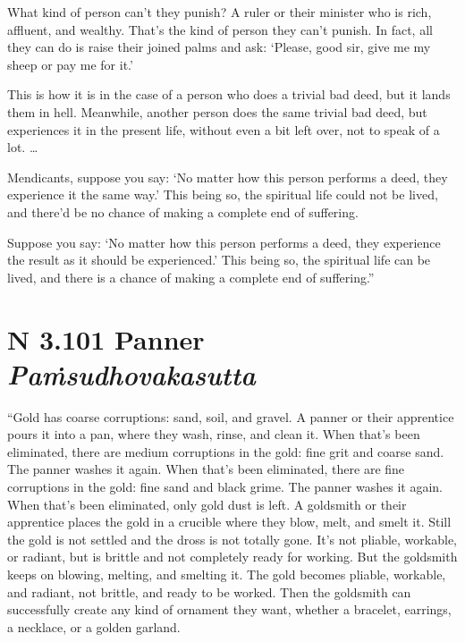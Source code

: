 \documentclass[12pt,openany]{book}%
\newcommand*{\suttatitleacronym}[1]{\smaller[2]{#1}\vspace*{.3em}}
\newcommand*{\suttatitletranslation}[1]{\linebreak{#1}}
\newcommand*{\suttatitleroot}[1]{\linebreak\smaller[2]\itshape{#1}}
\newcommand*{\tocacronym}[1]{\hspace*{-3.3em}{#1}\quad}
\newcommand*{\toctranslation}[1]{#1}
\newcommand*{\tocroot}[1]{(\textit{#1})}
\begin{document}
What kind of person can’t they punish? A ruler or their minister who is rich, affluent, and wealthy. That’s the kind of person they can’t punish. In fact, all they can do is raise their joined palms and ask: ‘Please, good sir, give me my sheep or pay me for it.’ 

This is how it is in the case of a person who does a trivial bad deed, but it lands them in hell. Meanwhile, another person does the same trivial bad deed, but experiences it in the present life, without even a bit left over, not to speak of a lot. … 

Mendicants, suppose you say: ‘No matter how this person performs a deed, they experience it the same way.’ This being so, the spiritual life could not be lived, and there’d be no chance of making a complete end of suffering. 

Suppose you say: ‘No matter how this person performs a deed, they experience the result as it should be experienced.’ This being so, the spiritual life can be lived, and there is a chance of making a complete end of suffering.” 

%
\section*{{\suttatitleacronym AN 3.101}{\suttatitletranslation A Panner }{\suttatitleroot Paṁsudhovakasutta}}
\addcontentsline{toc}{section}{\tocacronym{AN 3.101} \toctranslation{A Panner } \tocroot{Paṁsudhovakasutta}}

“Gold has coarse corruptions: sand, soil, and gravel. A panner or their apprentice pours it into a pan, where they wash, rinse, and clean it. When that’s been eliminated, there are medium corruptions in the gold: fine grit and coarse sand. The panner washes it again. When that’s been eliminated, there are fine corruptions in the gold: fine sand and black grime. The panner washes it again. When that’s been eliminated, only gold dust is left. A goldsmith or their apprentice places the gold in a crucible where they blow, melt, and smelt it. Still the gold is not settled and the dross is not totally gone. It’s not pliable, workable, or radiant, but is brittle and not completely ready for working. But the goldsmith keeps on blowing, melting, and smelting it. The gold becomes pliable, workable, and radiant, not brittle, and ready to be worked. Then the goldsmith can successfully create any kind of ornament they want, whether a bracelet, earrings, a necklace, or a golden garland. 
\end{document}
